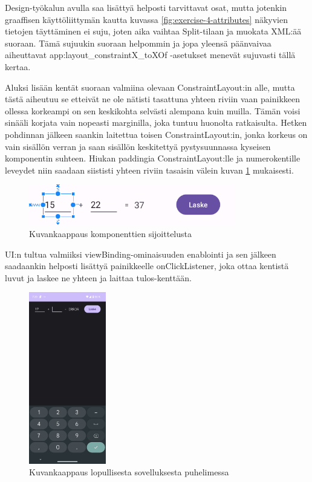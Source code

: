Design-työkalun avulla saa lisättyä helposti tarvittavat osat, mutta jotenkin
graaffisen käyttöliittymän kautta kuvassa \ref{fig:exercise-4-attributes}
näkyvien tietojen täyttäminen ei suju, joten aika vaihtaa Split-tilaan ja
muokata XML:ää suoraan. Tämä sujuukin suoraan helpommin ja jopa yleensä
päänvaivaa aiheuttavat app:layout\_constraintX\_toXOf -asetukset menevät
sujuvasti tällä kertaa.

Aluksi lisään kentät suoraan valmiina olevaan ConstraintLayout:in alle, mutta
tästä aiheutuu se etteivät ne ole nätisti tasattuna yhteen riviin vaan
painikkeen ollessa korkeampi on sen keskikohta selvästi alempana kuin muilla.
Tämän voisi sinääli korjata vain nopeasti marginilla, joka tuntuu huonolta
ratkaisulta. Hetken pohdinnan jälkeen saankin laitettua toisen
ConstraintLayout:in, jonka korkeus on vain sisällön verran ja saan sisällön
keskitettyä pystysuunnassa kyseisen komponentin suhteen. Hiukan paddingia
ConstraintLayout:lle ja numerokentille leveydet niin saadaan siististi yhteen
riviin tasaisin välein kuvan \ref{fig:exercise-4-constraint-layout} mukaisesti.

\begin{figure}[h!]
    \centering
    \includegraphics[width=0.8\textwidth]{figures/exercise-4-constraint-layout.png}
    \caption{Kuvankaappaus komponenttien sijoittelusta}
    \label{fig:exercise-4-constraint-layout}
\end{figure}

UI:n tultua valmiiksi viewBinding-ominaisuuden enablointi ja sen jälkeen
saadaankin helposti lisättyä painikkeelle onClickListener, joka ottaa kentistä
luvut ja laskee ne yhteen ja laittaa tulos-kenttään.

\begin{figure}
    \includegraphics[width=0.3\textwidth]{figures/exercise-4-final.png}
    \caption{Kuvankaappaus lopullisesta sovelluksesta puhelimessa}
    \label{fig:exercise-4-final}
\end{figure}

